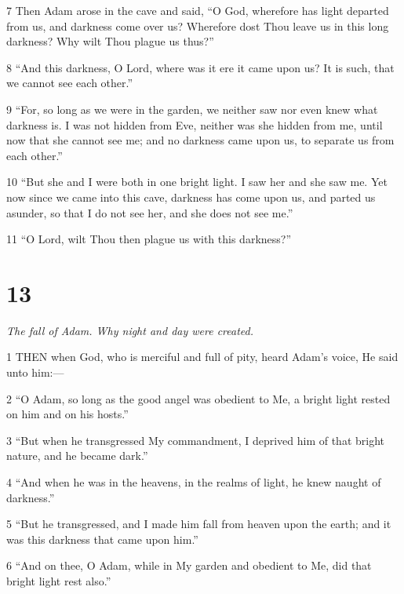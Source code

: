 \par 7 Then Adam arose in the cave and said, “O God, wherefore has light departed from us, and darkness come over us? Wherefore dost Thou leave us in this long darkness? Why wilt Thou plague us thus?”

\par 8 “And this darkness, O Lord, where was it ere it came upon us? It is such, that we cannot see each other.”

\par 9 “For, so long as we were in the garden, we neither saw nor even knew what darkness is. I was not hidden from Eve, neither was she hidden from me, until now that she cannot see me; and no darkness came upon us, to separate us from each other.”

\par 10 “But she and I were both in one bright light. I saw her and she saw me. Yet now since we came into this cave, darkness has come upon us, and parted us asunder, so that I do not see her, and she does not see me.”

\par 11 “O Lord, wilt Thou then plague us with this darkness?”

\chapter{13}

\par \textit{The fall of Adam. Why night and day were created.}

\par 1 THEN when God, who is merciful and full of pity, heard Adam's voice, He said unto him:—

\par 2 “O Adam, so long as the good angel was obedient to Me, a bright light rested on him and on his hosts.”

\par 3 “But when he transgressed My commandment, I deprived him of that bright nature, and he became dark.”

\par 4 “And when he was in the heavens, in the realms of light, he knew naught of darkness.”

\par 5 “But he transgressed, and I made him fall from heaven upon the earth; and it was this darkness that came upon him.”

\par 6 “And on thee, O Adam, while in My garden and obedient to Me, did that bright light rest also.”

